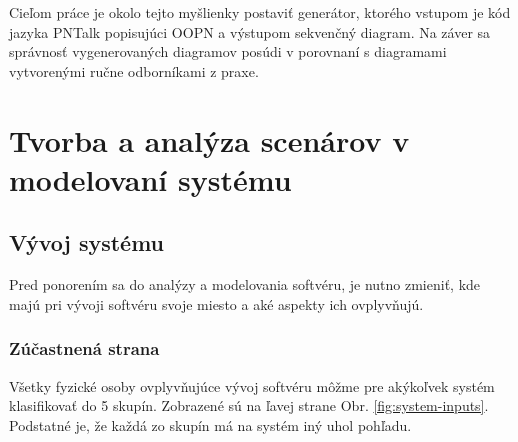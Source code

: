 Cieľom práce je okolo tejto myšlienky postaviť generátor, ktorého vstupom je kód jazyka PNTalk popisujúci OOPN a výstupom sekvenčný diagram. Na záver sa správnosť vygenerovaných diagramov posúdi v porovnaní s diagramami vytvorenými ručne odborníkami z praxe.

\chapter{Tvorba a analýza scenárov v modelovaní systému}

\section{Vývoj systému}

Pred ponorením sa do analýzy a modelovania softvéru, je nutno zmieniť, kde majú pri vývoji softvéru svoje miesto a aké aspekty ich ovplyvňujú.

\subsection{Zúčastnená strana}

Všetky fyzické osoby ovplyvňujúce vývoj softvéru môžme pre akýkoľvek systém klasifikovať do 5 skupín. Zobrazené sú na ľavej strane Obr. \ref{fig:system-inputs}. Podstatné je, že každá zo skupín má na systém iný uhol pohľadu.

